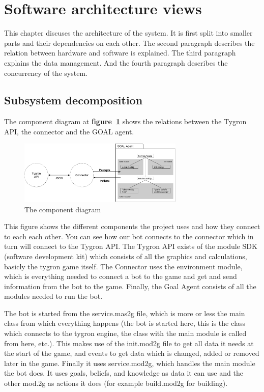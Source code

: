 \label{Software architecture views}
\section{Software architecture views}
This chapter discuses the architecture of the system. It is first split into smaller parts and their dependencies on each other. The second paragraph describes the relation between hardware and software is explained. The third paragraph explains the data management. And the fourth paragraph describes the concurrency of the system.

\subsection{Subsystem decomposition}

The component diagram at \textbf{figure~\ref{fig:comp_diag}} shows the relations between the Tygron API, the connector and the GOAL agent. 

\begin{figure}[h]
	  \centering
	  \includegraphics[width=0.7\textwidth]{system_decomposition}
	  \caption{The component diagram}
	  \label{fig:comp_diag}
\end{figure}
This figure shows the different components the project uses and how they connect to each each other. You can see how our bot connects to the connector which in turn will connect to the Tygron API. The Tygron API exists of the module SDK (software development kit) which consists of all the graphics and calculations, basicly the tygron game itself. The Connector uses the environment module, which is everything needed to connect a bot to the game and get and send information from the bot to the game. Finally, the Goal Agent consists of all the modules needed to run the bot.

The bot is started from the service.mas2g file, which is more or less the main class from which everything happens (the bot is started here, this is the class which connects to the tygron engine, the class with the main module is called from here, etc.). This makes use of the init.mod2g file to get all data it needs at the start of the game, and events to get data which is changed, added or removed later in the game. Finally it uses service.mod2g, which handles the main module the bot does. It uses goals, beliefs, and knowledge as data it can use and the other mod.2g as actions it does (for example build.mod2g for building).

